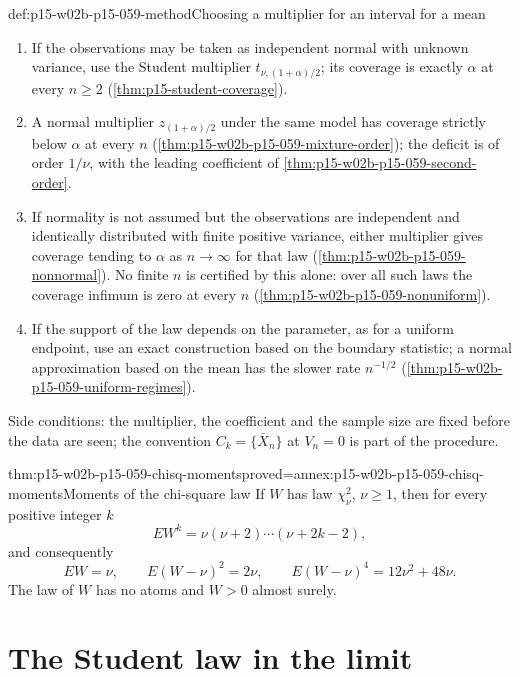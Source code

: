 \begin{hbmethod}{def:p15-w02b-p15-059-method}{Choosing a multiplier for an interval for a mean}
\begin{enumerate}
\item If the observations may be taken as independent normal with unknown
variance, use the Student multiplier \(t_{\nu,(1+\alpha)/2}\); its
coverage is exactly \(\alpha\) at every \(n\geq2\)
(\cref{thm:p15-student-coverage}).
\item A normal multiplier \(z_{(1+\alpha)/2}\) under the same model has
coverage strictly below \(\alpha\) at every \(n\)
(\cref{thm:p15-w02b-p15-059-mixture-order}); the deficit is of order
\(1/\nu\), with the leading coefficient of
\cref{thm:p15-w02b-p15-059-second-order}.
\item If normality is not assumed but the observations are independent and
identically distributed with finite positive variance, either multiplier
gives coverage tending to \(\alpha\) as \(n\to\infty\) for that law
(\cref{thm:p15-w02b-p15-059-nonnormal}). No finite \(n\) is certified by
this alone: over all such laws the coverage infimum is zero at every \(n\)
(\cref{thm:p15-w02b-p15-059-nonuniform}).
\item If the support of the law depends on the parameter, as for a uniform
endpoint, use an exact construction based on the boundary statistic; a
normal approximation based on the mean has the slower rate
\(n^{-1/2}\) (\cref{thm:p15-w02b-p15-059-uniform-regimes}).
\end{enumerate}
Side conditions: the multiplier, the coefficient and the sample size are
fixed before the data are seen; the convention \(C_k=\{\bar X_n\}\) at
\(V_n=0\) is part of the procedure.
\end{hbmethod}

\begin{hblemma}{thm:p15-w02b-p15-059-chisq-moments}{proved=annex:p15-w02b-p15-059-chisq-moments}{Moments of the chi-square law}
If \(W\) has law \(\chi^2_\nu\), \(\nu\geq1\), then for every positive
integer \(k\)
\[
 E W^k=\nu(\nu+2)\cdots(\nu+2k-2),
\]
and consequently
\[
 E W=\nu,\qquad E(W-\nu)^2=2\nu,\qquad E(W-\nu)^4=12\nu^2+48\nu.
\]
The law of \(W\) has no atoms and \(W>0\) almost surely.
\end{hblemma}

\section{The Student law in the limit}
\label{sec:p15-w02b-p15-059-limit}

